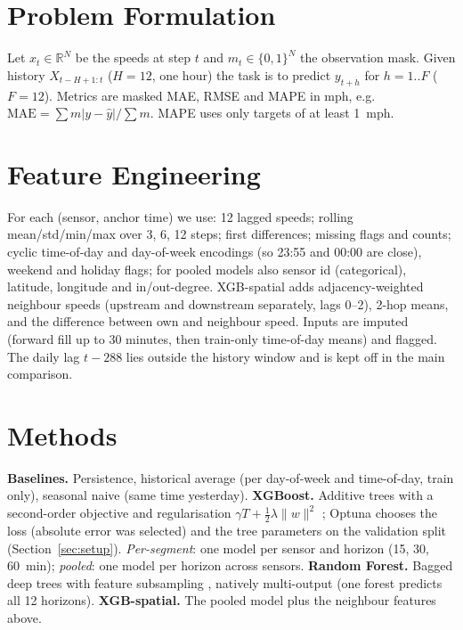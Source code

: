 \documentclass[conference]{IEEEtran}
\begin{document}
\section{Problem Formulation}
Let $x_t\in\mathbb{R}^{N}$ be the speeds at step $t$ and $m_t\in\{0,1\}^N$ the observation mask.
Given history $X_{t-H+1:t}$ ($H=12$, one hour) the task is to predict $y_{t+h}$ for $h=1..F$ ($F=12$).
Metrics are masked MAE, RMSE and MAPE in mph, e.g.\ $\mathrm{MAE}=\sum m|y-\hat y|/\sum m$.
MAPE uses only targets of at least 1~mph.

\section{Feature Engineering}
For each (sensor, anchor time) we use: 12 lagged speeds; rolling mean/std/min/max over 3, 6, 12 steps; first differences; missing flags and counts; cyclic time-of-day and day-of-week encodings (so 23:55 and 00:00 are close), weekend and holiday flags; for pooled models also sensor id (categorical), latitude, longitude and in/out-degree.
XGB-spatial adds adjacency-weighted neighbour speeds (upstream and downstream separately, lags 0--2), 2-hop means, and the difference between own and neighbour speed.
Inputs are imputed (forward fill up to 30 minutes, then train-only time-of-day means) and flagged.
The daily lag $t-288$ lies outside the history window and is kept off in the main comparison.

\section{Methods}
\textbf{Baselines.} Persistence, historical average (per day-of-week and time-of-day, train only), seasonal naive (same time yesterday).
\textbf{XGBoost.} Additive trees with a second-order objective and regularisation $\gamma T+\tfrac12\lambda\|w\|^2$ \cite{chen2016xgboost}; Optuna chooses the loss (absolute error was selected) and the tree parameters on the validation split (Section~\ref{sec:setup}).
\emph{Per-segment}: one model per sensor and horizon (15, 30, 60~min); \emph{pooled}: one model per horizon across sensors.
\textbf{Random Forest.} Bagged deep trees with feature subsampling \cite{breiman2001rf}, natively multi-output (one forest predicts all 12 horizons).
\textbf{XGB-spatial.} The pooled model plus the neighbour features above.
\end{document}
